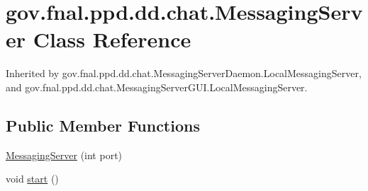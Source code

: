 \hypertarget{classgov_1_1fnal_1_1ppd_1_1dd_1_1chat_1_1MessagingServer}{\section{gov.\-fnal.\-ppd.\-dd.\-chat.\-Messaging\-Server Class Reference}
\label{classgov_1_1fnal_1_1ppd_1_1dd_1_1chat_1_1MessagingServer}
}


Inherited by gov.\-fnal.\-ppd.\-dd.\-chat.\-Messaging\-Server\-Daemon.\-Local\-Messaging\-Server, and gov.\-fnal.\-ppd.\-dd.\-chat.\-Messaging\-Server\-G\-U\-I.\-Local\-Messaging\-Server.

\subsection*{Public Member Functions}
\begin{DoxyCompactItemize}
\item 
\hyperlink{classgov_1_1fnal_1_1ppd_1_1dd_1_1chat_1_1MessagingServer_a9b02c801edad834dcc2a0c96071900af}{Messaging\-Server} (int port)
\item 
void \hyperlink{classgov_1_1fnal_1_1ppd_1_1dd_1_1chat_1_1MessagingServer_a69cf69b0f944a33ba7e1b9c32dd60ee6}{start} ()
\end{DoxyCompactItemize}
